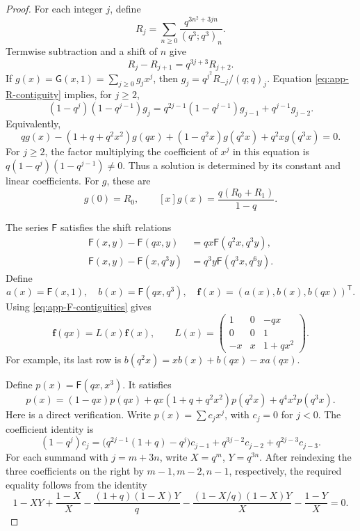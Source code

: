 \documentclass[11pt]{article}
\numberwithin{equation}{section}
\theoremstyle{remark}
\begin{document}
\begin{proof}
For each integer \(j\), define
\[
 R_j=\sum_{n\geq0}\frac{q^{3n^2+3jn}}{(q^3;q^3)_n}.
\]
Termwise subtraction and a shift of \(n\) give
\begin{equation}\label{eq:app-R-contiguity}
 R_j-R_{j+1}=q^{3j+3}R_{j+2}.
\end{equation}
If \(g(x)=\mathsf G(x,1)=\sum_{j\geq0}g_jx^j\), then
\(g_j=q^{j^2}R_{-j}/(q;q)_j\).  Equation
\eqref{eq:app-R-contiguity} implies, for \(j\geq2\),
\[
 (1-q^j)(1-q^{j-1})g_j
 =q^{2j-1}(1-q^{j-1})g_{j-1}+q^{j-1}g_{j-2}.
\]
Equivalently,
\begin{equation}\label{eq:app-scalar-equation}
 qg(x)-(1+q+q^2x^2)g(qx)
       +(1-q^2x)g(q^2x)+q^2xg(q^3x)=0.
\end{equation}
For \(j\geq2\), the factor multiplying the coefficient of \(x^j\)
in this equation is \(q(1-q^j)(1-q^{j-1})\ne0\).
Thus a solution is determined by its constant and linear coefficients.  For \(g\),
these are
\begin{equation}\label{eq:app-g-initial}
 g(0)=R_0,\qquad [x]g(x)=\frac{q(R_0+R_1)}{1-q}.
\end{equation}

The series \(\mathsf F\) satisfies the shift relations
\begin{equation}\label{eq:app-F-contiguities}
\begin{aligned}
 \mathsf F(x,y)-\mathsf F(qx,y)
       &=qx\mathsf F(q^2x,q^3y),\\
 \mathsf F(x,y)-\mathsf F(x,q^3y)
       &=q^3y\mathsf F(q^3x,q^6y).
\end{aligned}
\end{equation}
Define
\[
 a(x)=\mathsf F(x,1),\quad b(x)=\mathsf F(qx,q^3),\quad
 \mathbf f(x)=(a(x),b(x),b(qx))^{\mathsf T}.
\]
Using \eqref{eq:app-F-contiguities} gives
\begin{equation}\label{eq:app-L-system}
 \mathbf f(qx)=L(x)\mathbf f(x),\qquad
 L(x)=\begin{pmatrix}1&0&-qx\\0&0&1\\-x&x&1+qx^2\end{pmatrix}.
\end{equation}
For example, its last row is
\(b(q^2x)=xb(x)+b(qx)-xa(qx)\).

Define \(p(x)=\mathsf F(qx,x^3)\).  It satisfies
\begin{equation}\label{eq:app-p-recurrence}
 p(x)=(1-qx)p(qx)+qx(1+q+q^2x^2)p(q^2x)+q^4x^2p(q^3x).
\end{equation}
Here is a direct verification.  Write \(p(x)=\sum c_jx^j\), with
\(c_j=0\) for \(j<0\).  The coefficient identity is
\[
 (1-q^j)c_j
 =\bigl(q^{2j-1}(1+q)-q^j\bigr)c_{j-1}
       +q^{3j-2}c_{j-2}+q^{2j-3}c_{j-3}.
\]
For each summand with \(j=m+3n\), write \(X=q^m\), \(Y=q^{3n}\).
After reindexing the three coefficients on the right by
\(m-1,m-2,n-1\), respectively, the required equality follows from the identity
\[
 1-XY+\frac{1-X}{X}-\frac{(1+q)(1-X)Y}{q}
 -\frac{(1-X/q)(1-X)Y}{X}-\frac{1-Y}{X}=0.
\]


\end{proof}
\end{document}
